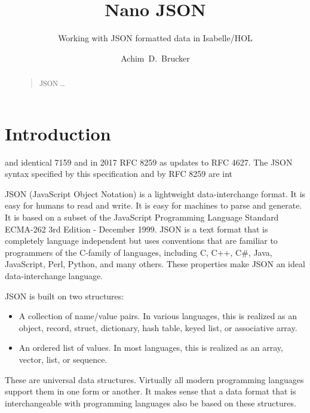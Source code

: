 \documentclass[10pt,DIV16,a4paper,abstract=true,twoside=semi,openright]
{scrreprt}
\title{Nano JSON}
\subtitle{Working with JSON formatted data in Isabelle/HOL}
\author{Achim~D.~Brucker}%
\begin{document}
  \maketitle
  \begin{abstract}
    \begin{quote}
      JSON \ldots

      \bigskip
    \end{quote}
  \end{abstract}
\tableofcontents


\chapter{Introduction}



\cite{ecma:json:2017,ietf:rfc8259-json:2017}


and identical 7159 and in 2017 RFC 8259 as updates to RFC
        4627. The JSON syntax specified by this specification and by RFC 8259 are int

JSON (JavaScript Object Notation) is a lightweight data-interchange
format. It is easy for humans to read and write. It is easy for
machines to parse and generate. It is based on a subset of the
JavaScript Programming Language Standard ECMA-262 3rd Edition -
December 1999. JSON is a text format that is completely language
independent but uses conventions that are familiar to programmers of
the C-family of languages, including C, C++, C\#, Java, JavaScript,
Perl, Python, and many others. These properties make JSON an ideal
data-interchange language.

JSON is built on two structures:
\begin{itemize}
\item A collection of name/value pairs. In various languages, this is
  realized as an object, record, struct, dictionary, hash table, keyed
  list, or associative array.
\item An ordered list of values. In most languages, this is realized
  as an array, vector, list, or sequence.
\end{itemize}

These are universal data structures. Virtually all modern programming
languages support them in one form or another. It makes sense that a
data format that is interchangeable with programming languages also be
based on these structures.




{\small
  
  
}
\end{document}
